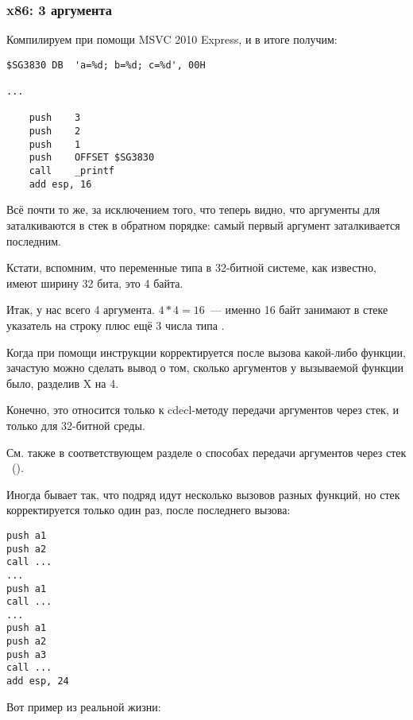 \subsubsection{x86: 3 аргумента}


Компилируем при помощи MSVC 2010 Express, и в итоге получим:

\begin{lstlisting}
$SG3830	DB	'a=%d; b=%d; c=%d', 00H

...

	push	3
	push	2
	push	1
	push	OFFSET $SG3830
	call	_printf
	add	esp, 16
\end{lstlisting}

Всё почти то же, за исключением того, что теперь видно, что аргументы для \printf заталкиваются в стек в обратном порядке: самый первый аргумент заталкивается последним.

Кстати, вспомним, что переменные типа \Tint в 32-битной системе, как известно, имеют ширину 32 бита, это 4 байта.

Итак, у нас всего 4 аргумента. $4*4 = 16$~--- именно 16 байт занимают в стеке указатель на строку плюс ещё 3 числа типа \Tint.

Когда при помощи инструкции  корректируется  \ESP 
после вызова какой-либо функции, зачастую можно сделать вывод о том, сколько аргументов 
у вызываемой функции было, разделив X на 4.

Конечно, это относится только к cdecl-методу передачи аргументов через стек, и только для 32-битной среды.

См. также в соответствующем разделе о способах передачи аргументов через стек ~().

Иногда бывает так, что подряд идут несколько вызовов разных функций, но стек корректируется только один раз, после последнего вызова:

\begin{lstlisting}
push a1
push a2
call ...
...
push a1
call ...
...
push a1
push a2
push a3
call ...
add esp, 24
\end{lstlisting}

Вот пример из реальной жизни:



\clearpage
{}
\myindex{\olly}

